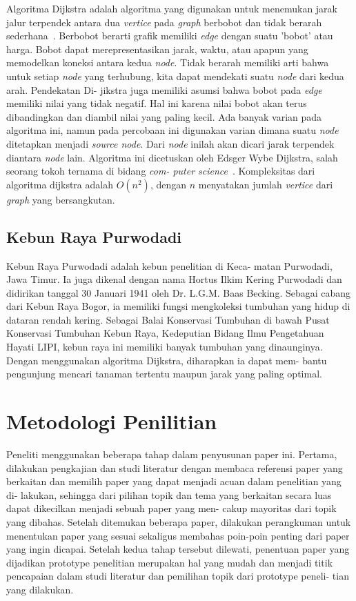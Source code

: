 \documentclass[conference]{IEEEtran}
\begin{document}
    Algoritma Dijkstra adalah algoritma yang digunakan untuk
    menemukan jarak jalur terpendek antara dua \textit{vertice} pada
    \textit{graph} berbobot dan tidak berarah sederhana~\cite{rosen2012discrete}. Berbobot
    berarti grafik memiliki \textit{edge} dengan suatu ’bobot’ atau harga.
    Bobot dapat merepresentasikan jarak, waktu, atau apapun
    yang memodelkan koneksi antara kedua \textit{node}. Tidak berarah
    memiliki arti bahwa untuk setiap \textit{node} yang terhubung, kita
    dapat mendekati suatu \textit{node} dari kedua arah. Pendekatan Di-
    jikstra juga memiliki asumsi bahwa bobot pada \textit{edge} memiliki
    nilai yang tidak negatif. Hal ini karena nilai bobot akan
    terus dibandingkan dan diambil nilai yang paling kecil. Ada
    banyak varian pada algoritma ini, namun pada percobaan
    ini digunakan varian dimana suatu \textit{node} ditetapkan menjadi
    \textit{source node}. Dari \textit{node} inilah akan dicari jarak terpendek
    diantara \textit{node} lain. Algoritma ini dicetuskan oleh Edsger
    Wybe Dijkstra, salah seorang tokoh ternama di bidang \textit{com-
    puter science}~\cite{dijkstra1959note}. Kompleksitas dari algoritma dijkstra adalah
    $O(n^2)$, dengan $n$ menyatakan jumlah \textit{vertice} dari \textit{graph} yang
    bersangkutan.
\subsection{Kebun Raya Purwodadi}
    Kebun Raya Purwodadi adalah kebun penelitian di Keca-
    matan Purwodadi, Jawa Timur. Ia juga dikenal dengan nama
    Hortus Ilkim Kering Purwodadi dan didirikan tanggal 30 Januari 1941 oleh Dr. L.G.M. Baas Becking. Sebagai cabang dari
    Kebun Raya Bogor, ia memiliki fungsi mengkoleksi tumbuhan
    yang hidup di dataran rendah kering. Sebagai Balai Konservasi
    Tumbuhan di bawah Pusat Konservasi Tumbuhan Kebun Raya,
    Kedeputian Bidang Ilmu Pengetahuan Hayati LIPI, kebun raya
    ini memiliki banyak tumbuhan yang dinaunginya. Dengan
    menggunakan algoritma Dijkstra, diharapkan ia dapat mem-
    bantu pengunjung mencari tanaman tertentu maupun jarak
    yang paling optimal.


\section{Metodologi Penilitian}
Peneliti menggunakan beberapa tahap dalam penyusunan
paper ini. Pertama, dilakukan pengkajian dan studi literatur
dengan membaca referensi paper yang berkaitan dan memilih
paper yang dapat menjadi acuan dalam penelitian yang di-
lakukan, sehingga dari pilihan topik dan tema yang berkaitan
secara luas dapat dikecilkan menjadi sebuah paper yang men-
cakup mayoritas dari topik yang dibahas. Setelah ditemukan
beberapa paper, dilakukan perangkuman untuk menentukan
paper yang sesuai sekaligus membahas poin-poin penting
dari paper yang ingin dicapai. Setelah kedua tahap tersebut
dilewati, penentuan paper yang dijadikan prototype penelitian
merupakan hal yang mudah dan menjadi titik pencapaian
dalam studi literatur dan pemilihan topik dari prototype peneli-
tian yang dilakukan.
\end{document}
